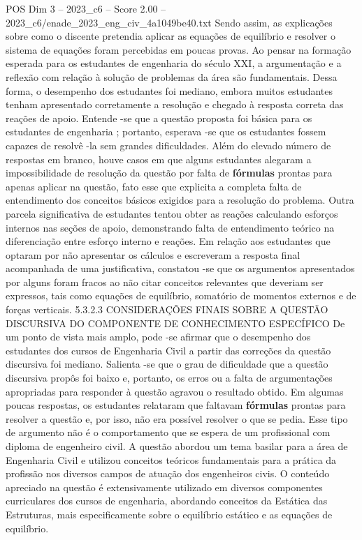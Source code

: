 \begin{textsample}{POS Dim 3 – 2023\_c6 – Score 2.00 – 2023\_c6/enade\_2023\_eng\_civ\_4a1049be40.txt}
Sendo assim, as explicações sobre como o discente pretendia aplicar as equações de equilíbrio e resolver o sistema de equações foram percebidas em poucas provas.
Ao pensar na formação esperada para os estudantes de engenharia do século XXI, a argumentação e a reflexão com relação à solução de problemas da área são fundamentais.
Dessa forma, o desempenho dos estudantes foi mediano, embora muitos estudantes tenham apresentado corretamente a resolução e chegado à resposta correta das reações de apoio.
Entende -se que a questão proposta foi básica para os estudantes de engenharia ; portanto, esperava -se que os estudantes fossem capazes de resolvê -la sem grandes dificuldades.
Além do elevado número de respostas em branco, houve casos em que alguns estudantes alegaram a impossibilidade de resolução da questão por falta de \textbf{fórmulas} prontas para apenas aplicar na questão, fato esse que explicita a completa falta de entendimento dos conceitos básicos exigidos para a resolução do problema.
Outra parcela significativa de estudantes tentou obter as reações calculando esforços internos nas seções de apoio, demonstrando falta de entendimento teórico na diferenciação entre esforço interno e reações.
Em relação aos estudantes que optaram por não apresentar os cálculos e escreveram a resposta final acompanhada de uma justificativa, constatou -se que os argumentos apresentados por alguns foram fracos ao não citar conceitos relevantes que deveriam ser expressos, tais como equações de equilíbrio, somatório de momentos externos e de forças verticais. 5.3.2.3 CONSIDERAÇÕES FINAIS SOBRE A QUESTÃO DISCURSIVA DO COMPONENTE DE CONHECIMENTO ESPECÍFICO De um ponto de vista mais amplo, pode -se afirmar que o desempenho dos estudantes dos cursos de Engenharia Civil a partir das correções da questão discursiva foi mediano.
Salienta -se que o grau de dificuldade que a questão discursiva propôs foi baixo e, portanto, os erros ou a falta de argumentações apropriadas para responder à questão agravou o resultado obtido.
Em algumas poucas respostas, os estudantes relataram que faltavam \textbf{fórmulas} prontas para resolver a questão e, por isso, não era possível resolver o que se pedia.
Esse tipo de argumento não é o comportamento que se espera de um profissional com diploma de engenheiro civil.
A questão abordou um tema basilar para a área de Engenharia Civil e utilizou conceitos teóricos fundamentais para a prática da profissão nos diversos campos de atuação dos engenheiros civis.
O conteúdo apreciado na questão é extensivamente utilizado em diversos componentes curriculares dos cursos de engenharia, abordando conceitos da Estática das Estruturas, mais especificamente sobre o equilíbrio estático e as equações de equilíbrio.

\end{textsample}
